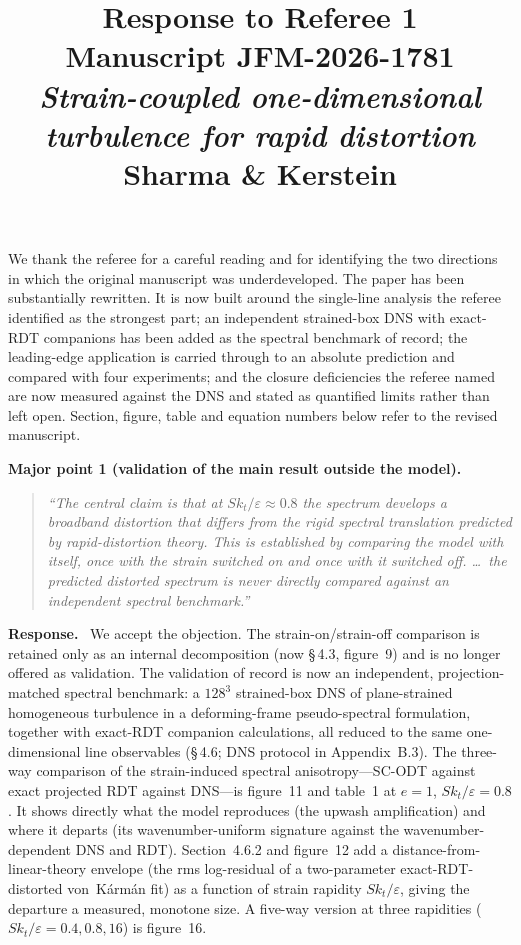 \documentclass[11pt]{article}
\title{Response to Referee 1\\[2pt]
\large Manuscript JFM-2026-1781\\
\emph{Strain-coupled one-dimensional turbulence for rapid distortion}\\
Sharma \& Kerstein}
\date{}
\newenvironment{refcomment}%
  {\begin{quote}\color{commentgray}\itshape}%
  {\end{quote}}
\newcommand{\response}{\medskip\noindent\textbf{Response.}\ }
\newcommand{\point}[1]{\bigskip\noindent\textbf{#1}}
\begin{document}
\maketitle

We thank the referee for a careful reading and for identifying the two
directions in which the original manuscript was underdeveloped. The paper
has been substantially rewritten. It is now built around the single-line
analysis the referee identified as the strongest part; an independent
strained-box DNS with exact-RDT companions has been added as the spectral
benchmark of record; the leading-edge application is carried through to an
absolute prediction and compared with four experiments; and the closure
deficiencies the referee named are now measured against the DNS and stated
as quantified limits rather than left open. Section, figure, table and
equation numbers below refer to the revised manuscript.

\point{Major point 1 (validation of the main result outside the model).}
\begin{refcomment}
``The central claim is that at $Sk_t/\varepsilon \approx 0.8$ the spectrum
develops a broadband distortion that differs from the rigid spectral
translation predicted by rapid-distortion theory. This is established by
comparing the model with itself, once with the strain switched on and once
with it switched off. \ldots\ the predicted distorted spectrum is never
directly compared against an independent spectral benchmark.''
\end{refcomment}

\response
We accept the objection. The strain-on/strain-off comparison is retained
only as an internal decomposition (now \S\,4.3, figure~9) and is no longer
offered as validation. The validation of record is now an independent,
projection-matched spectral benchmark: a $128^3$ strained-box DNS of
plane-strained homogeneous turbulence in a deforming-frame pseudo-spectral
formulation, together with exact-RDT companion calculations, all reduced to
the same one-dimensional line observables (\S\,4.6; DNS protocol in
Appendix~B.3). The three-way comparison of the strain-induced spectral
anisotropy---SC-ODT against exact projected RDT against DNS---is
figure~11 and table~1 at $e=1$, $Sk_t/\varepsilon=0.8$. It shows directly
what the model reproduces (the upwash amplification) and where it departs
(its wavenumber-uniform signature against the wavenumber-dependent DNS and
RDT). Section~4.6.2 and figure~12 add a distance-from-linear-theory
envelope (the rms log-residual of a two-parameter exact-RDT-distorted
von~K\'arm\'an fit) as a function of strain rapidity $Sk_t/\varepsilon$,
giving the departure a measured, monotone size. A five-way version at three
rapidities ($Sk_t/\varepsilon=0.4,0.8,16$) is figure~16.
\end{document}
